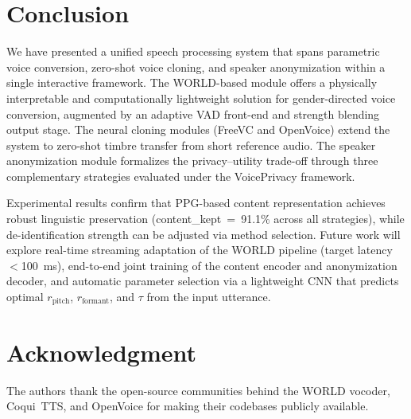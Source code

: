 \documentclass[conference]{IEEEtran}
\begin{document}
\section{Conclusion}
\label{sec:conclusion}

We have presented a unified speech processing system that spans
parametric voice conversion, zero-shot voice cloning, and speaker
anonymization within a single interactive framework.
The WORLD-based module offers a physically interpretable and
computationally lightweight solution for gender-directed voice
conversion, augmented by an adaptive VAD front-end and strength
blending output stage.
The neural cloning modules (FreeVC and OpenVoice) extend the system
to zero-shot timbre transfer from short reference audio.
The speaker anonymization module formalizes the privacy--utility
trade-off through three complementary strategies evaluated under the
VoicePrivacy framework.

Experimental results confirm that PPG-based content representation
achieves robust linguistic preservation (content\_kept~=~91.1\%
across all strategies), while de-identification strength can be
adjusted via method selection.
Future work will explore real-time streaming adaptation of the WORLD
pipeline (target latency~$<$100~ms), end-to-end joint training of the
content encoder and anonymization decoder, and automatic parameter
selection via a lightweight CNN that predicts optimal
$r_\text{pitch}$, $r_\text{formant}$, and $\tau$ from the input
utterance.

\section*{Acknowledgment}

The authors thank the open-source communities behind the WORLD
vocoder, Coqui~TTS, and OpenVoice for making their codebases publicly
available.
\end{document}
